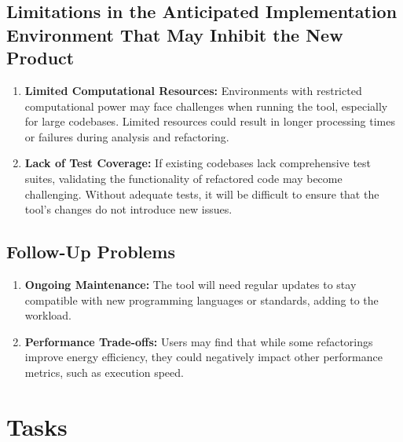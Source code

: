 \documentclass[12pt]{article}
\begin{document}
\subsection{Limitations in the Anticipated Implementation Environment That May
Inhibit the New Product}
\begin{enumerate}
  \item \textbf{Limited Computational Resources:} Environments with
    restricted computational power may face challenges when running
    the tool, especially for large codebases. Limited resources could
    result in longer processing times or failures during analysis and
    refactoring.
  \item \textbf{Lack of Test Coverage:} If existing codebases lack
    comprehensive test suites, validating the functionality of
    refactored code may become challenging. Without adequate tests,
    it will be difficult to ensure that the tool's changes do not
    introduce new issues.
\end{enumerate}
\subsection{Follow-Up Problems}
\begin{enumerate}
  \item \textbf{Ongoing Maintenance:} The tool will need regular
    updates to stay compatible with new programming languages or
    standards, adding to the workload.
  \item \textbf{Performance Trade-offs:} Users may find that while
    some refactorings improve energy efficiency, they could
    negatively impact other performance metrics, such as execution speed.
\end{enumerate}
\section{Tasks}
\end{document}
